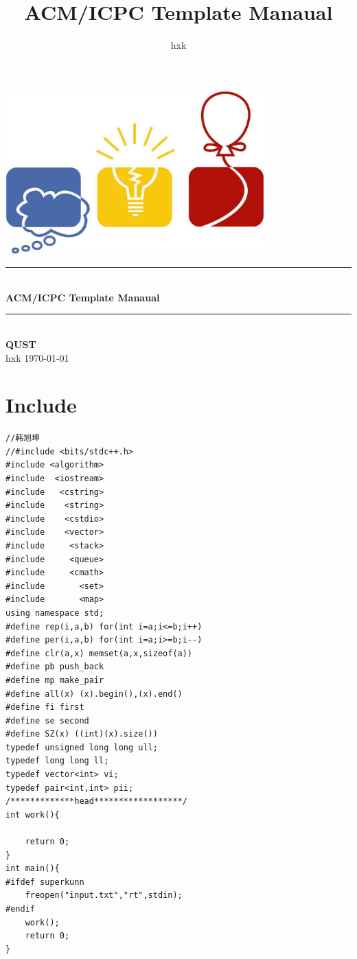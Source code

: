 \documentclass[twoside]{article}
\title{ACM/ICPC Template Manaual}
\author{hxk}
\newcommand{\HRule}{\rule{\linewidth}{0.5mm}}
\begin{document}
\small
\begin{titlepage}
\begin{center}
\vspace*{0.5cm}\includegraphics[width=0.75\textwidth]{logo.jpg} \\ [2cm]
\HRule \\ [1cm]
\textbf{\Huge{ACM/ICPC Template Manaual}} \\ [0.5cm]
\HRule \\ [4cm]
\textbf{\Huge{QUST}} \\ [1cm]
\LARGE{hxk}
\vfill
\Large{\today}
\end{center}
\clearpage
\end{titlepage}
\tableofcontents\clearpage
\pagestyle{fancy}
\lfoot{}
\cfoot{\thepage}\rfoot{}
\setcounter{section}{-1}
\setcounter{page}{1}
\clearpage\section{Include}
\begin{lstlisting}
//韩旭坤
//#include <bits/stdc++.h>
#include <algorithm>
#include  <iostream>
#include   <cstring>
#include    <string>
#include    <cstdio>
#include    <vector>
#include     <stack>
#include     <queue>
#include     <cmath>
#include       <set>
#include       <map>
using namespace std;
#define rep(i,a,b) for(int i=a;i<=b;i++)
#define per(i,a,b) for(int i=a;i>=b;i--)
#define clr(a,x) memset(a,x,sizeof(a))
#define pb push_back
#define mp make_pair
#define all(x) (x).begin(),(x).end()
#define fi first
#define se second
#define SZ(x) ((int)(x).size())
typedef unsigned long long ull;
typedef long long ll;
typedef vector<int> vi;
typedef pair<int,int> pii;
/*************head******************/
int work(){
    
    return 0;
}
int main(){
#ifdef superkunn
    freopen("input.txt","rt",stdin);
#endif
    work();
    return 0;
}
\end{lstlisting}
\end{document}

